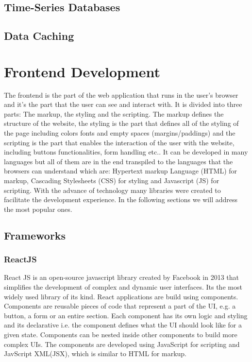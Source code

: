 \subsection{Time-Series Databases}
\subsection{Data Caching}

\section{Frontend Development}
The frontend is the part of the web application that runs in the user's
browser and it's the part that the user can see and interact with.
It is divided into three parts: The markup, the styling and the scripting.
The markup defines the structure of the website, the styling is the part that
defines all of the styling of the page including colors fonts and empty spaces
(margins/paddings) and the scripting is the part that enables the interaction
of the user with the website, including buttons functionalities, form handling
etc..
It can be developed in many languages but all of them are in the end transpiled
to the languages that the browsers can understand which are: Hypertext markup
Language (HTML) for markup, Cascading Stylesheets (CSS) for styling and
Javascript (JS) for scripting.
With the advance of technology many libraries were created to facilitate the
development experience. In the following sections we will address the most
popular ones.

\subsection{Frameworks}

\subsubsection{ReactJS}
React JS is an open-source javascript library created by Facebook in 2013 that
simplifies the development of complex and dynamic user interfaces. Its the most widely
used library of its kind.
React applications are build using components. Components are reusable pieces of
code that represent a part of the UI, e.g. a button, a form or an entire section.
Each component has its own logic and styling and its declarative i.e. the
component defines what the UI should look like for a given state.
Components can be nested inside other components to build more complex UIs.
The components are developed using JavaScript for scripting and JavScript XML(JSX),
which is similar to HTML for markup.

